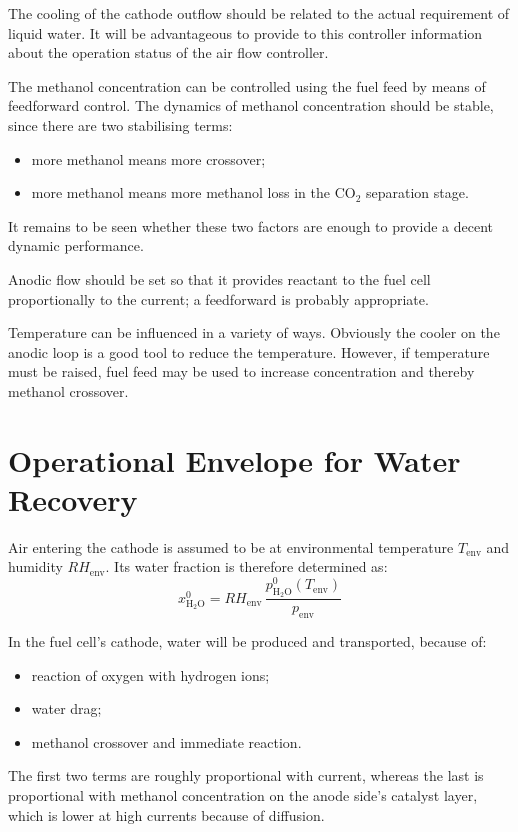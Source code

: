 \documentclass[a4paper,10pt]{article}
\newcommand{\HHO}{\ensuremath{\mathrm{H_2O}}}
\newcommand{\COO}{\ensuremath{\mathrm{CO_2}}}
\begin{document}
The cooling of the cathode outflow should be related to the actual requirement
of liquid water. It will be advantageous to provide to this controller
information about the operation status of the air flow controller.

The methanol concentration can be controlled using the fuel feed by means of
feedforward control. The dynamics of methanol concentration should be stable,
since there are two stabilising terms:
\begin{itemize}
\item more methanol means more crossover;
\item more methanol means more methanol loss in the \COO{} separation stage.
\end{itemize}
It remains to be seen whether these two factors are enough to provide a decent
dynamic performance.

Anodic flow should be set so that it provides reactant to the fuel cell
proportionally to the current; a feedforward is probably appropriate.

Temperature can be influenced in a variety of ways. Obviously the cooler on the
anodic loop is a good tool to reduce the temperature. However, if temperature
must be raised, fuel feed may be used to increase concentration and thereby
methanol crossover.

\pagebreak
\section{Operational Envelope for Water Recovery}
Air entering the cathode is assumed to be at environmental temperature
$T_\text{env}$ and humidity $RH_\text{env}$. Its water fraction is therefore
determined as:
\begin{equation}
x_\HHO^0 = RH_\text{env}\,\frac{p_\HHO^0(T_\text{env})}{p_\text{env}}
\end{equation}

In the fuel cell's cathode, water will be produced and transported, because of:
\begin{itemize}
\item reaction of oxygen with hydrogen ions;
\item water drag;
\item methanol crossover and immediate reaction.
\end{itemize}

The first two terms are roughly proportional with current, whereas the last is
proportional with methanol concentration on the anode side's catalyst layer,
which is lower at high currents because of diffusion.
\end{document}

